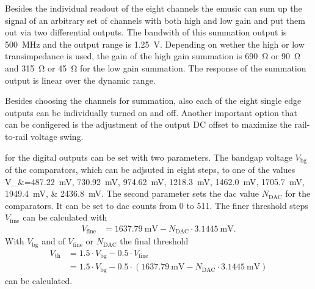 Besides the individual readout of the eight channels the \ac{emusic} can sum up the signal of an arbitrary set of channels with both high and low gain and put them out via two differential outputs.
The bandwith of this summation output is \SI{500}{\mega\hertz} and the output range is \SI{1.25}{\volt}.
Depending on wether the high or low transimpedance is used, the gain of the high gain summation is \SI{690}{\ohm} or \SI{90}{\ohm} and \SI{315}{\ohm} or \SI{45}{\ohm} for the low gain summation. 
The response of the summation output is linear over the dynamic range.

Besides choosing the channels for summation, also each of the eight single edge outputs can be individually turned on and off.
Another important option that can be configered is the adjustment of the output DC offset to maximize the rail-to-rail voltage swing.

 for the digital outputs can be set with two parameters.
The bandgap voltage $V_\text{bg}$ of the comparators, which can be adjsuted in eight steps, to one of the values V_&=\SIlist{487.22;730.92;974.62;1218.3;1462.0;1705.7;1949.4;2436.8}{\milli\volt}.
The second parameter sets the \ac{dac} value $N_\text{DAC}$ for the comparators.
It can be set to \ac{dac} counts from 0 to 511.
The finer threshold steps $V_\text{fine}$ can be calculated with
\begin{align}
	V_\text{fine}&=\SI{1637.79}{\milli\volt} - N_\text{DAC}\cdot\SI{3.1445}{\milli\volt}.
\end{align}
With $V_\text{bg}$ and  of $V_\text{fine}$ or $N_\text{DAC}$ the final threshold
\begin{align}
	V_\text{th}&= 1.5\cdot V_\text{bg} - 0.5\cdot V_\text{fine}\\
		   &= 1.5\cdot V_\text{bg} - 0.5\cdot (\SI{1637.79}{\milli\volt} - N_\text{DAC}\cdot\SI{3.1445}{\milli\volt})
\end{align}
can be calculated.

